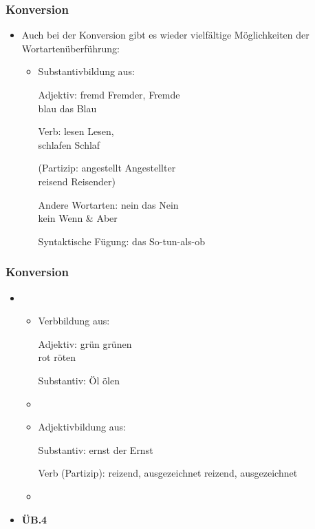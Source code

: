 \begin{frame}
\frametitle{Konversion}

\begin{itemize}
	\item Auch bei der Konversion gibt es wieder vielfältige Möglichkeiten der Wortartenüberführung:
	
	\begin{itemize}
		\item Substantivbildung aus: 
		
		\ea Adjektiv: fremd \ras Fremder, Fremde\\ blau \ras das Blau
		\z
			
		\ea Verb: lesen \ras  Lesen, \\schlafen \ras Schlaf 
		\z
		
		\ea (Partizip: angestellt \ras Angestellter\\ reisend \ras  Reisender)
		\z
			
		\ea Andere Wortarten: nein \ras  das Nein\\ kein Wenn \& Aber 
		\z
		
		\ea Syntaktische Fügung: das So-tun-als-ob
		\z
		
	\end{itemize}
	
\end{itemize}

\end{frame}




\begin{frame}
\frametitle{Konversion}

\begin{itemize}
	\item[]
	
	\begin{itemize}

		\item Verbbildung aus: 
		
		\ea Adjektiv: grün \ras grünen\\ rot \ras röten 
		\z
		
		\ea Substantiv: Öl \ras ölen 
		\z
		
		\item[]

		\item Adjektivbildung aus: 
		
		\ea Substantiv: ernst \ras der Ernst 
		\z
		
		\ea Verb (Partizip): reizend, ausgezeichnet \ras reizend, ausgezeichnet
		\z
		
		\item[]
	
	\end{itemize}

	\item \textbf{ÜB.4}
	
\end{itemize}

\end{frame}



